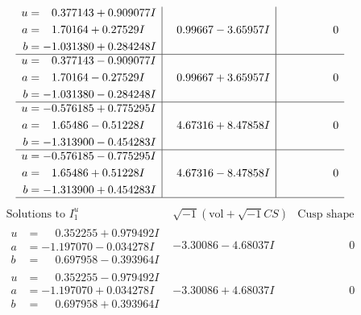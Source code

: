 \documentclass[1p]{elsarticle_modified}
\theoremstyle{definition}
\newcommand{\I}{\sqrt{-1}}
\begin{document}
$$\begin{array}{c|c|c}
\begin{aligned}
u &= \phantom{-}0.377143 + 0.909077 I \\
a &= \phantom{-}1.70164 + 0.27529 I \\
b &= -1.031380 + 0.284248 I\end{aligned}
 & \phantom{-}0.99667 - 3.65957 I & \phantom{-0.000000 } 0 \\ \hline\begin{aligned}
u &= \phantom{-}0.377143 - 0.909077 I \\
a &= \phantom{-}1.70164 - 0.27529 I \\
b &= -1.031380 - 0.284248 I\end{aligned}
 & \phantom{-}0.99667 + 3.65957 I & \phantom{-0.000000 } 0 \\ \hline\begin{aligned}
u &= -0.576185 + 0.775295 I \\
a &= \phantom{-}1.65486 - 0.51228 I \\
b &= -1.313900 - 0.454283 I\end{aligned}
 & \phantom{-}4.67316 + 8.47858 I & \phantom{-0.000000 } 0 \\ \hline\begin{aligned}
u &= -0.576185 - 0.775295 I \\
a &= \phantom{-}1.65486 + 0.51228 I \\
b &= -1.313900 + 0.454283 I\end{aligned}
 & \phantom{-}4.67316 - 8.47858 I & \phantom{-0.000000 } 0\\
 \hline 
 \end{array}$$\newpage$$\begin{array}{c|c|c}  
\text{Solutions to }I^u_{1}& \I (\text{vol} + \sqrt{-1}CS) & \text{Cusp shape}\\
 \hline 
\begin{aligned}
u &= \phantom{-}0.352255 + 0.979492 I \\
a &= -1.197070 - 0.034278 I \\
b &= \phantom{-}0.697958 - 0.393964 I\end{aligned}
 & -3.30086 - 4.68037 I & \phantom{-0.000000 } 0 \\ \hline\begin{aligned}
u &= \phantom{-}0.352255 - 0.979492 I \\
a &= -1.197070 + 0.034278 I \\
b &= \phantom{-}0.697958 + 0.393964 I\end{aligned}
 & -3.30086 + 4.68037 I & \phantom{-0.000000 } 0 \\ \hline\begin{aligned}

\end{aligned}
\end{array}$$
\end{document}
